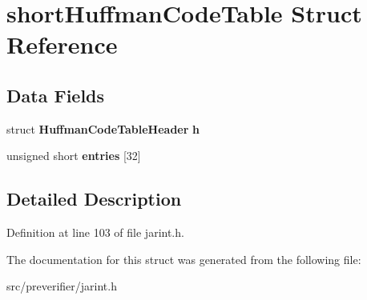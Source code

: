 \section{shortHuffmanCodeTable Struct Reference}
\label{structshort_huffman_code_table}
\subsection*{Data Fields}
\begin{DoxyCompactItemize}
\item 
struct {\bf HuffmanCodeTableHeader} {\bfseries h}\label{structshort_huffman_code_table_af6bef660bd586e0791bc6d28e3b6001c}

\item 
unsigned short {\bfseries entries} [32]\label{structshort_huffman_code_table_ab15d31e7c8fc0543817da4e6744f7dbf}

\end{DoxyCompactItemize}


\subsection{Detailed Description}


Definition at line 103 of file jarint.h.



The documentation for this struct was generated from the following file:\begin{DoxyCompactItemize}
\item 
src/preverifier/jarint.h\end{DoxyCompactItemize}
